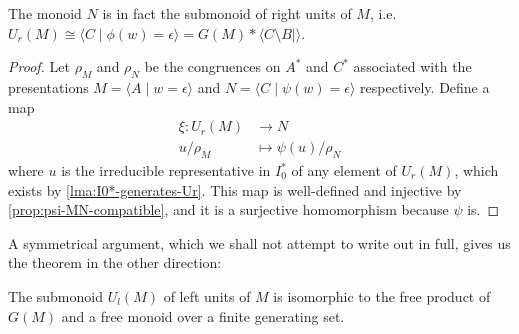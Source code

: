 \documentclass[noindex,noinsetproof,12pt]{lmaths}
\begin{document}
\begin{theorem} \label{thm:spec-units-factor-freely}
	The monoid $N$ is in fact the submonoid of right units of $M$, i.e. $U_r(M) \cong \langle C \mid \phi(w) = \epsilon \rangle = G(M) \ast \langle C \setminus B \mid \rangle$.
\end{theorem}
\begin{proof}
	Let $\rho_M$ and $\rho_N$ be the congruences on $A^*$ and $C^*$ associated with the presentations $M = \langle A \mid w = \epsilon \rangle$ and $N = \langle C \mid \psi(w) = \epsilon\rangle$ respectively.
	Define a map
		\begin{align*}
			\xi : U_r(M) &\to N \\
			 u/\rho_M &\mapsto \psi(u)/\rho_N
		\end{align*}
	where $u$ is the irreducible representative in $I_0^*$ of any element of $U_r(M)$, which exists by \cref{lma:I0*-generates-Ur}. This map is well-defined and injective by \cref{prop:psi-MN-compatible}, and it is a surjective homomorphism because $\psi$ is.
\end{proof}

A symmetrical argument, which we shall not attempt to write out in full, gives us the theorem in the other direction:
\begin{theorem}
	The submonoid $U_l(M)$ of left units of $M$ is isomorphic to the free product of $G(M)$ and a free monoid over a finite generating set.
\end{theorem}
\end{document}
